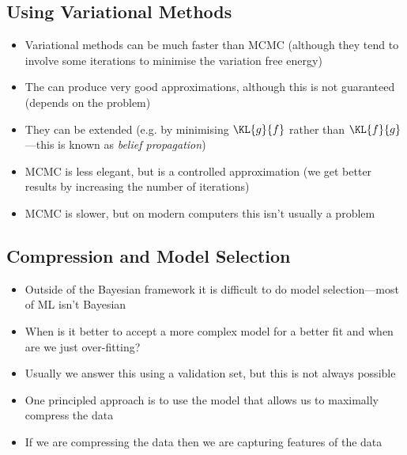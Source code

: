 \begin{slide}
\section[-2]{Using Variational Methods}

\begin{PauseHighLight}
  \begin{itemize}
  \item Variational methods can be much faster than MCMC (although
    they tend to involve some iterations to minimise the variation
    free energy)\pause
  \item The can produce very good approximations, although this is not
    guaranteed (depends on the problem)\pause
  \item They can be extended (e.g. by minimising $\KL{g}{f}$
    rather than $\KL{f}{g}$---this is known as\textit{ belief
      propagation})\pause
  \item MCMC is less elegant, but is a controlled approximation (we get
    better results by increasing the number of iterations)\pause
  \item MCMC is slower, but on modern computers this isn't usually a
    problem\pause
  \end{itemize}
\end{PauseHighLight}

\end{slide}




\Outline %

\begin{slide}
\section[-1]{Compression and Model Selection}
  
\begin{PauseHighLight}
  \begin{itemize}
  \item Outside of the Bayesian framework it is difficult to do model
    selection\pause---most of ML isn't Bayesian\pauseb
  \item When is it better to accept a more complex model for a better
    fit and when are we just over-fitting?\pause
  \item Usually we answer this using a validation set, but this is not
    always possible\pause
  \item One principled approach is to use the model that allows us to
    maximally compress the data\pause
  \item If we are compressing the data then we are capturing features
    of the data\pause
  \end{itemize}
\end{PauseHighLight}

\end{slide}

